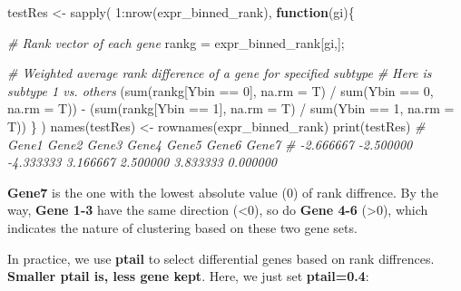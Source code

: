 \documentclass[
  12pt,
]{book}
\newenvironment{Shaded}{\begin{snugshade}}{\end{snugshade}}
\newcommand{\AttributeTok}[1]{\textcolor[rgb]{0.77,0.63,0.00}{#1}}
\newcommand{\CommentTok}[1]{\textcolor[rgb]{0.56,0.35,0.01}{\textit{#1}}}
\newcommand{\ControlFlowTok}[1]{\textcolor[rgb]{0.13,0.29,0.53}{\textbf{#1}}}
\newcommand{\DecValTok}[1]{\textcolor[rgb]{0.00,0.00,0.81}{#1}}
\newcommand{\FunctionTok}[1]{\textcolor[rgb]{0.00,0.00,0.00}{#1}}
\newcommand{\NormalTok}[1]{#1}
\newcommand{\OtherTok}[1]{\textcolor[rgb]{0.56,0.35,0.01}{#1}}
\newcommand{\SpecialCharTok}[1]{\textcolor[rgb]{0.00,0.00,0.00}{#1}}
\begin{document}
\begin{Shaded}
\begin{Highlighting}[]
\NormalTok{testRes }\OtherTok{\textless{}{-}} \FunctionTok{sapply}\NormalTok{(}
  \DecValTok{1}\SpecialCharTok{:}\FunctionTok{nrow}\NormalTok{(expr\_binned\_rank), }
  \ControlFlowTok{function}\NormalTok{(gi)\{}
    
    \CommentTok{\# Rank vector of each gene}
\NormalTok{    rankg }\OtherTok{=}\NormalTok{ expr\_binned\_rank[gi,];}
    
    \CommentTok{\# Weighted average rank difference of a gene for specified subtype }
    \CommentTok{\# Here is subtype 1 vs. others}
\NormalTok{    (}\FunctionTok{sum}\NormalTok{(rankg[Ybin }\SpecialCharTok{==} \DecValTok{0}\NormalTok{], }\AttributeTok{na.rm =}\NormalTok{ T) }\SpecialCharTok{/} \FunctionTok{sum}\NormalTok{(Ybin }\SpecialCharTok{==} \DecValTok{0}\NormalTok{, }\AttributeTok{na.rm =}\NormalTok{ T)) }\SpecialCharTok{{-}} 
\NormalTok{    (}\FunctionTok{sum}\NormalTok{(rankg[Ybin }\SpecialCharTok{==} \DecValTok{1}\NormalTok{], }\AttributeTok{na.rm =}\NormalTok{ T) }\SpecialCharTok{/} \FunctionTok{sum}\NormalTok{(Ybin }\SpecialCharTok{==} \DecValTok{1}\NormalTok{, }\AttributeTok{na.rm =}\NormalTok{ T))}
\NormalTok{  \}}
\NormalTok{)}
\FunctionTok{names}\NormalTok{(testRes) }\OtherTok{\textless{}{-}} \FunctionTok{rownames}\NormalTok{(expr\_binned\_rank)}
\FunctionTok{print}\NormalTok{(testRes)}
\CommentTok{\#     Gene1     Gene2     Gene3     Gene4     Gene5     Gene6     Gene7 }
\CommentTok{\# {-}2.666667 {-}2.500000 {-}4.333333  3.166667  2.500000  3.833333  0.000000}
\end{Highlighting}
\end{Shaded}

\textbf{Gene7} is the one with the lowest absolute value (0) of rank diffrence. By the way, \textbf{Gene 1-3} have the same direction (\textless0), so do \textbf{Gene 4-6} (\textgreater0), which indicates the nature of clustering based on these two gene sets.

In practice, we use \textbf{ptail} to select differential genes based on rank diffrences. \textbf{Smaller ptail is, less gene kept}. Here, we just set \textbf{ptail=0.4}:
\end{document}
